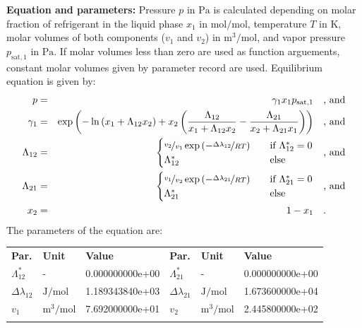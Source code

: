\textbf{Equation and parameters:}
\newline
%
Pressure $p$ in $\si{\pascal}$ is calculated depending on molar fraction of refrigerant in the liquid phase $x_1$ in $\si{\mole\per\mole}$, temperature $T$ in $\si{\kelvin}$, molar volumes of both components ($v_1$ and $v_2$) in $\si{\cubic\meter\per\mole}$, and vapor pressure $p_\mathrm{sat,1}$ in $\si{\pascal}$. If molar volumes less than zero are used as function arguements, constant molar volumes given by parameter record are used. Equilibrium equation is given by:
%
\begin{equation*}
\begin{split}
p &=& \gamma_1 x_1 p_\mathrm{sat,1} & \quad\text{, and} \\
\gamma_1 &=& \exp \left( - \ln \left( x_1 + \Lambda_{12} x_2 \right) + x_2 \left( \frac{\Lambda_{12}}{x_1 + \Lambda_{12} x_2} - \frac{\Lambda_{21}}{x_2 + \Lambda_{21} x_1} \right) \right) & \quad\text{, and} \\
\Lambda_{12} &=& \begin{cases} \nicefrac{v_2}{v_1} \exp \left( - \nicefrac{\Delta\lambda_{12}}{R T} \right) & \quad \text{if } \Lambda_{12}^{*} = 0 \\ \Lambda_{12}^{*}  & \quad \text{else} \end{cases}  & \quad\text{, and} \\
\Lambda_{21} &=& \begin{cases} \nicefrac{v_1}{v_2} \exp \left( - \nicefrac{\Delta\lambda_{21}}{R T} \right) & \quad \text{if } \Lambda_{21}^{*} = 0 \\ \Lambda_{21}^{*}  & \quad \text{else} \end{cases}  & \quad\text{, and} \\
x_2 &=& 1 - x_1  & \quad\text{.} \\
\end{split}
\end{equation*}
%
The parameters of the equation are:
%
\begin{longtable}[l]{lll|lll}
\toprule
\addlinespace
\textbf{Par.} & \textbf{Unit} & \textbf{Value} &	\textbf{Par.} & \textbf{Unit} & \textbf{Value} \\
\addlinespace
\midrule
\endhead

\bottomrule
\endfoot
\bottomrule
\endlastfoot
\addlinespace

$\Lambda_{12}^{*}$ & - & 0.000000000e+00 & $\Lambda_{21}^{*}$ & - & 0.000000000e+00 \\
$\Delta\lambda_{12}$ & $\si{\joule\per\mole}$ & 1.189343840e+03 & $\Delta\lambda_{21}$ & $\si{\joule\per\mole}$ & 1.673600000e+04 \\
$v_1$ & $\si{\cubic\meter\per\mole}$ & 7.692000000e+01 & $v_2$ & $\si{\cubic\meter\per\mole}$ & 2.445800000e+02 \\

\addlinespace\end{longtable}

